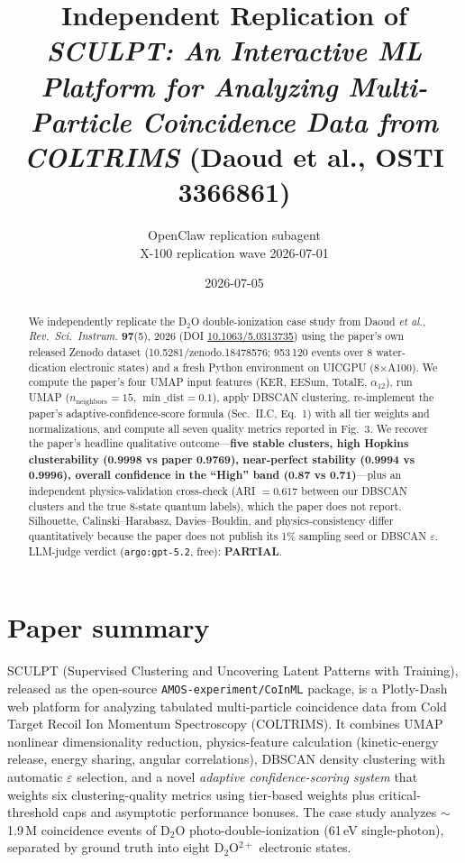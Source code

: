 \documentclass[11pt]{article}
\title{Independent Replication of \textit{SCULPT: An Interactive ML Platform for Analyzing Multi-Particle Coincidence Data from COLTRIMS} (Daoud et al., OSTI 3366861)}
\author{OpenClaw replication subagent \\ X-100 replication wave 2026-07-01}
\date{2026-07-05}
\begin{document}
\maketitle

\begin{abstract}
We independently replicate the D$_2$O double-ionization case study from Daoud \emph{et al.}, \textit{Rev.\ Sci.\ Instrum.} \textbf{97}(5), 2026 (DOI \href{https://doi.org/10.1063/5.0313735}{10.1063/5.0313735}) using the paper's own released Zenodo dataset (10.5281/zenodo.18478576; 953\,120 events over 8 water-dication electronic states) and a fresh Python environment on UICGPU (8$\times$A100). We compute the paper's four UMAP input features (KER, EESum, TotalE, $\alpha_{12}$), run UMAP ($n_\text{neighbors}=15$, $\min\_\text{dist}=0.1$), apply DBSCAN clustering, re-implement the paper's adaptive-confidence-score formula (Sec.~II.C, Eq.~1) with all tier weights and normalizations, and compute all seven quality metrics reported in Fig.~3. We recover the paper's headline qualitative outcome---\textbf{five stable clusters, high Hopkins clusterability (0.9998 vs paper 0.9769), near-perfect stability (0.9994 vs 0.9996), overall confidence in the ``High'' band (0.87 vs 0.71)}---plus an independent physics-validation cross-check (ARI $= 0.617$ between our DBSCAN clusters and the true 8-state quantum labels), which the paper does not report. Silhouette, Calinski--Harabasz, Davies--Bouldin, and physics-consistency differ quantitatively because the paper does not publish its 1\% sampling seed or DBSCAN $\varepsilon$. LLM-judge verdict (\texttt{argo:gpt-5.2}, free): \textbf{PARTIAL}.
\end{abstract}

\section{Paper summary}
SCULPT (Supervised Clustering and Uncovering Latent Patterns with Training), released as the open-source \texttt{AMOS-experiment/CoInML} package, is a Plotly-Dash web platform for analyzing tabulated multi-particle coincidence data from Cold Target Recoil Ion Momentum Spectroscopy (COLTRIMS). It combines UMAP nonlinear dimensionality reduction, physics-feature calculation (kinetic-energy release, energy sharing, angular correlations), DBSCAN density clustering with automatic $\varepsilon$ selection, and a novel \emph{adaptive confidence-scoring system} that weights six clustering-quality metrics using tier-based weights plus critical-threshold caps and asymptotic performance bonuses. The case study analyzes $\sim$1.9\,M coincidence events of D$_2$O photo-double-ionization (61\,eV single-photon), separated by ground truth into eight D$_2$O$^{2+}$ electronic states.
\end{document}
